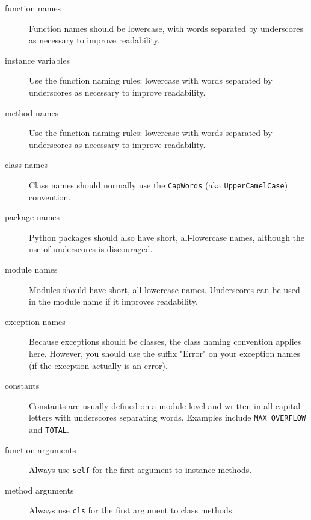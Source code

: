 \begin{description}
    \item [function names] Function names should be lowercase, with words separated by underscores as necessary to improve readability.

    \item [instance variables] Use the function naming rules: lowercase with words separated by underscores as necessary to improve readability.

    \item [method names] Use the function naming rules: lowercase with words separated by underscores as necessary to improve readability.

    \item [class names] Class names should normally use the {\tt CapWords} (aka {\tt UpperCamelCase}) convention.

    \item [package names] Python packages should also have short, all-lowercase names, although the use of underscores is discouraged.

    \item [module names] Modules should have short, all-lowercase names. Underscores can be used in the module name if it improves readability.

    \item [exception names] Because exceptions should be classes, the class naming convention applies here. However, you should use the suffix "Error" on your exception names (if the exception actually is an error).

    \item [constants] Constants are usually defined on a module level and written in all capital letters with underscores separating words. Examples include {\tt MAX\_OVERFLOW} and {\tt TOTAL}.

    \item [function arguments] Always use {\tt self} for the first argument to instance methods.

    \item [method arguments] Always use {\tt cls} for the first argument to class methods.


\end{description}






